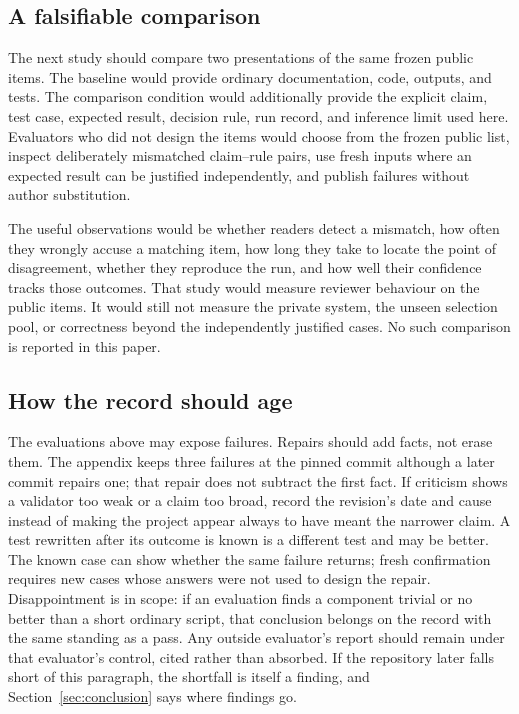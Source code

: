 \documentclass[11pt]{article}
\begin{document}
\subsection*{A falsifiable comparison}

The next study should compare two presentations of the same frozen public
items.  The baseline would provide ordinary documentation, code, outputs, and
tests.  The comparison condition would additionally provide the explicit
claim, test case, expected result, decision rule, run record, and inference
limit used here.  Evaluators who did not design the items would choose from the
frozen public list, inspect deliberately mismatched claim--rule pairs, use
fresh inputs where an expected result can be justified independently, and
publish failures without author substitution.

The useful observations would be whether readers detect a mismatch, how often
they wrongly accuse a matching item, how long they take to locate the point of
disagreement, whether they reproduce the run, and how well their confidence
tracks those outcomes.  That study would measure reviewer behaviour on the
public items.  It would still not measure the private system, the unseen
selection pool, or correctness beyond the independently justified cases.  No
such comparison is reported in this paper.

\subsection*{How the record should age}

The evaluations above may expose failures. Repairs should add facts, not erase
them. The appendix keeps three failures at the pinned commit although a later
commit repairs one; that repair does not subtract the first fact. If criticism
shows a validator too weak or a claim too broad, record the revision's date and
cause instead of making the project appear always to have meant the narrower
claim. A test rewritten after its outcome is known is a different test and may
be better. The known case can show whether the same failure returns; fresh
confirmation requires new cases whose answers were not used to design the
repair. Disappointment is in scope: if an evaluation finds a component trivial
or no better than a short ordinary script, that conclusion belongs on the
record with the same standing as a pass. Any outside evaluator's report should
remain under that evaluator's control, cited rather than absorbed. If the
repository later falls short of this paragraph, the shortfall is itself a
finding, and Section~\ref{sec:conclusion} says where findings go.
\end{document}
